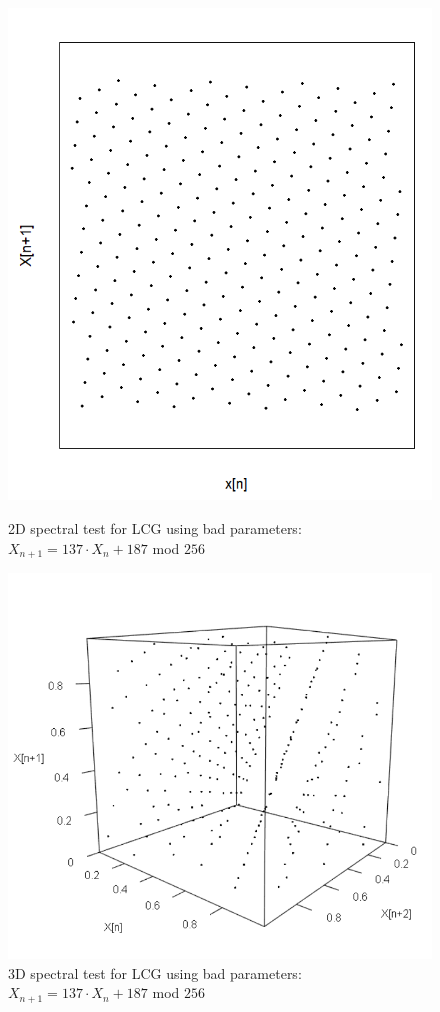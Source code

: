 \begin{figure}
	\centering
	\begin{minipage}{0.45\textwidth}
		\centering
		\includegraphics[width=\linewidth]{billder/spec_bad_lcg_2d.png}
		\caption{2D spectral test for LCG using bad parameters: $X_{n+1}=137\cdot X_{n}+187$ mod $256$}
		\label{fig:badspec2d}
	\end{minipage}\hfill
	\begin{minipage}{0.45\textwidth}
		\centering
		\includegraphics[width=\linewidth]{billder/spec_bad_lcg_3d.png}
		\caption{3D spectral test for LCG using bad parameters: $X_{n+1}=137\cdot X_{n}+187$ mod $256$}
		\label{fig:badspec3d}
	\end{minipage}
\end{figure}

